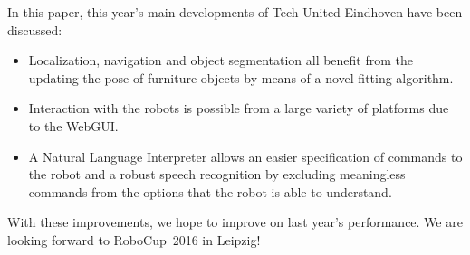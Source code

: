 In this paper, this year's main developments of Tech United Eindhoven have been discussed: 
\begin{itemize}
	\item Localization, navigation and object segmentation all benefit from the updating the pose of furniture objects by means of a novel fitting algorithm.
	\item Interaction with the robots is possible from a large variety of platforms due to the WebGUI.
	\item A Natural Language Interpreter allows an easier specification of commands to the robot and a robust speech recognition by excluding meaningless commands from the options that the robot is able to understand.
\end{itemize}
With these improvements, we hope to improve on last year's performance. We are looking forward to RoboCup~2016 in Leipzig!